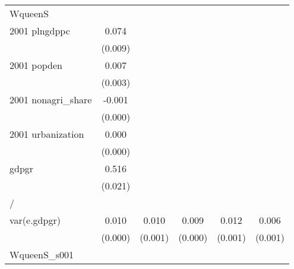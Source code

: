 \begin{table}[htbp]
\begin{tabular}{l*{5}{c}}
\hline
WqueenS             &                     &                     &                     &                     &                     \\
2001 plngdppc       &       0.074\sym{***}&                     &                     &                     &                     \\
                    &     (0.009)         &                     &                     &                     &                     \\
2001 popden         &       0.007\sym{***}&                     &                     &                     &                     \\
                    &     (0.003)         &                     &                     &                     &                     \\
2001 nonagri\_share  &      -0.001\sym{***}&                     &                     &                     &                     \\
                    &     (0.000)         &                     &                     &                     &                     \\
2001 urbanization   &       0.000         &                     &                     &                     &                     \\
                    &     (0.000)         &                     &                     &                     &                     \\
gdpgr               &       0.516\sym{***}&                     &                     &                     &                     \\
                    &     (0.021)         &                     &                     &                     &                     \\
\hline
/                   &                     &                     &                     &                     &                     \\
var(e.gdpgr)        &       0.010\sym{***}&       0.010\sym{***}&       0.009\sym{***}&       0.012\sym{***}&       0.006\sym{***}\\
                    &     (0.000)         &     (0.001)         &     (0.000)         &     (0.001)         &     (0.001)         \\
\hline
WqueenS\_s001        &                     &                     &                     &                     &                     \\

\end{tabular}
\end{table}
